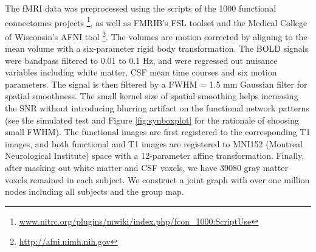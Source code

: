 \documentclass[review,authoryear]{elsarticle}
\begin{document}
The fMRI data was preprocessed using the scripts of the 1000 functional
connectomes
projects \footnote{\url{www.nitrc.org/plugins/mwiki/index.php/fcon_1000:ScriptUse}},
as well as FMRIB's FSL toolset and the Medical College of Wisconsin's AFNI
tool \footnote{\url{http://afni.nimh.nih.gov}}. The volumes are motion corrected
by aligning to the mean volume with a six-parameter rigid body
transformation. The BOLD signals were bandpass filtered to 0.01 to 0.1 Hz, and
were regressed out nuisance variables including white matter, CSF mean time
courses and six motion parameters. The signal is then filtered by a FWHM = 1.5
mm Gaussian filter for spatial smoothness. The small kernel size of spatial
smoothing helps increasing the SNR without introducing
blurring artifact on the functional network patterns (see the simulated test and
Figure \ref{fig:synboxplot} for the rationale of choosing small FWHM). The
functional images are first registered to the corresponding T1 images, and both
functional and T1 images are registered to MNI152 (Montreal Neurological
Institute) space with a 12-parameter affine transformation. Finally, after
masking out white matter and CSF voxels, we have 39080 gray matter voxels
remained in each subject. We construct a joint graph with over one million nodes
including all subjects and the group map.
\end{document}
